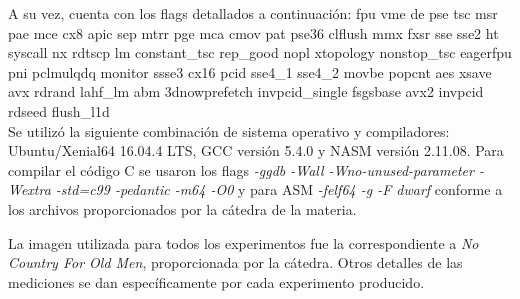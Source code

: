 A su vez, cuenta con los flags detallados a continuación: 
fpu vme de pse tsc msr pae mce cx8 apic sep mtrr pge mca cmov pat pse36 clflush mmx fxsr sse sse2 ht syscall nx rdtscp lm constant_tsc rep_good nopl xtopology nonstop_tsc eagerfpu pni pclmulqdq monitor ssse3 cx16 pcid sse4_1 sse4_2 movbe popcnt aes xsave avx rdrand lahf_lm abm 3dnowprefetch invpcid_single fsgsbase avx2 invpcid rdseed flush_l1d \\

Se utilizó la siguiente combinación de sistema operativo y compiladores: Ubuntu/Xenial64 16.04.4 LTS, GCC versión 5.4.0 y NASM versión 2.11.08. Para compilar el código C se usaron los flags \textit{-ggdb -Wall -Wno-unused-parameter -Wextra -std=c99 -pedantic -m64 -O0} y para ASM \textit{-felf64 -g -F dwarf} conforme a los archivos proporcionados por la cátedra de la materia.

La imagen utilizada para todos los experimentos fue la correspondiente a \textit{No Country For Old Men}, proporcionada por la cátedra. Otros detalles de las mediciones se dan específicamente por cada experimento producido.